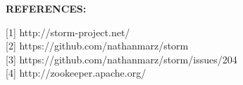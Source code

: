 \thispagestyle{plain} 

\begin{center}
{\bfseries REFERENCES:}\\[8mm] 
\begin{flushleft}
\hspace*{16mm}[1] http://storm-project.net/ \\[4mm]
\hspace*{16mm}[2] https://github.com/nathanmarz/storm \\[4mm]
\hspace*{16mm}[3] https://github.com/nathanmarz/storm/issues/204 \\[4mm]
\hspace*{16mm}[4] http://zookeeper.apache.org/ \\[4mm]
\end{flushleft}
\end{center}

